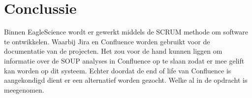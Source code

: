 %
%


\section{Conclussie}\label{sec:ESconclussie}
Binnen EagleScience wordt er gewerkt middels de SCRUM methode om software te ontwikkelen. Waarbij Jira en Confluence worden gebruikt voor de documentatie van de projecten. Het zou voor de hand kunnen liggen om informatie over de SOUP analyses in Confluence op te slaan zodat er mee gelift kan worden op dit systeem. Echter doordat de end of life van Confluence is aangekondigd dient er een alternatief worden gezocht. Welke al in de opdracht is meegenomen.

